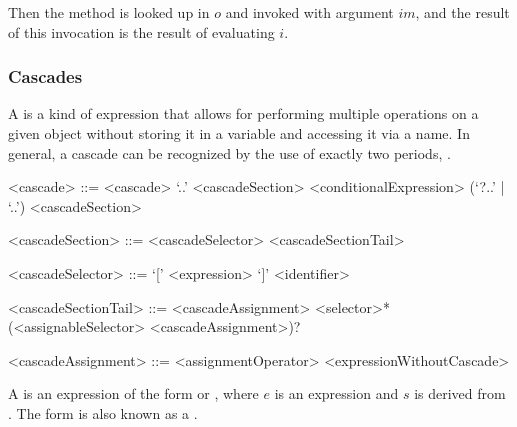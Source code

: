 \documentclass[makeidx]{article}
\begin{document}
{\LMHash{}%
Then the method  is looked up in $o$ and invoked with argument $im$,
and the result of this invocation is the result of evaluating $i$.

\EndCase


\subsubsection{Cascades}

\LMHash{}%
A  is a kind of expression that allows for performing
multiple operations on a given object
without storing it in a variable and accessing it via a name.
In general, a cascade can be recognized by the use of exactly two periods,
.

\begin{grammar}
<cascade> ::= <cascade> `..' <cascadeSection>
  \alt <conditionalExpression> (`?..' | `..') <cascadeSection>

<cascadeSection> ::= <cascadeSelector> <cascadeSectionTail>

<cascadeSelector> ::= `[' <expression> `]'
  \alt <identifier>

<cascadeSectionTail> ::= <cascadeAssignment>
  \alt <selector>* (<assignableSelector> <cascadeAssignment>)?

<cascadeAssignment> ::= <assignmentOperator> <expressionWithoutCascade>
\end{grammar}

\LMHash{}%
A 
is an expression of the form
 or ,
where $e$ is an expression
and $s$ is derived from .
The form
is also known as a
.



}
\end{document}
